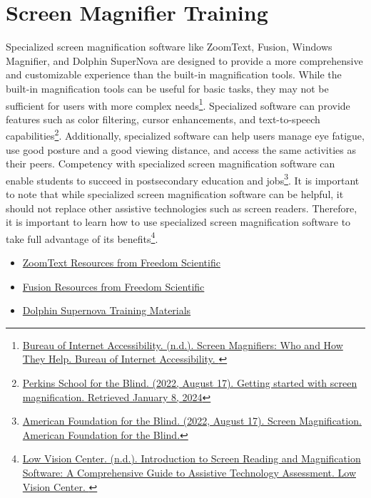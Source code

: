 \pagebreak\hypertarget{appx11}{}\section[Screen Magnifier Training]{Screen Magnifier Training}\label{appx11}
Specialized screen magnification software like ZoomText, Fusion, Windows Magnifier, and Dolphin SuperNova are designed to provide a more comprehensive and customizable experience than the built-in magnification tools. While the built-in magnification tools can be useful for basic tasks, they may not be sufficient for users with more complex needs\footnote{\raggedright \href{https://www.boia.org/blog/screen-magnifiers-who-and-how-they-help}{Bureau of Internet Accessibility. (n.d.). Screen Magnifiers: Who and How They Help. Bureau of Internet Accessibility. }}. Specialized software can provide features such as color filtering, cursor enhancements, and text-to-speech capabilities\footnote{\raggedright \href{https://www.perkins.org/resource/getting-started-screen-magnification/}{Perkins School for the Blind. (2022, August 17). Getting started with screen magnification. Retrieved January 8, 2024}}. Additionally, specialized software can help users manage eye fatigue, use good posture and a good viewing distance, and access the same activities as their peers. Competency with specialized screen magnification software can enable students to succeed in postsecondary education and jobs\footnote{\raggedright \href{https://www.afb.org/blindness-and-low-vision/using-technology/screen-magnification}{American Foundation for the Blind. (2022, August 17). Screen Magnification. American Foundation for the Blind.}}. It is important to note that while specialized screen magnification software can be helpful, it should not replace other assistive technologies such as screen readers. Therefore, it is important to learn how to use specialized screen magnification software to take full advantage of its benefits\footnotemark[\value{footnote}]\fnsep\footnote{\raggedright \href{https://nelowvision.com/introduction-to-screen-reading-and-magnification-software-a-comprehensive-guide-to-assistive-technology-assessment/}{Low Vision Center. (n.d.). Introduction to Screen Reading and Magnification Software: A Comprehensive Guide to Assistive Technology Assessment. Low Vision Center. }}.
\begin{itemize}[leftmargin=*]
	\item \href{https://support.freedomscientific.com/teachers/resources/ZoomText\_resources.zip}{ZoomText Resources from Freedom Scientific} 
	\item \href{https://support.freedomscientific.com/teachers/resources/Fusion\_resources.zip}{Fusion Resources from Freedom Scientific} 
	\item \href{https://yourdolphin.com/support/tutorials}{Dolphin Supernova Training Materials} 
\end{itemize}

